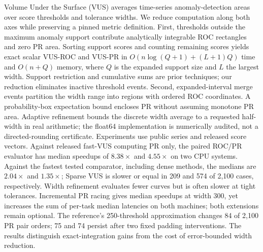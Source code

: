 Volume Under the Surface (VUS) averages time-series anomaly-detection areas
over score thresholds and tolerance widths. We reduce computation along both
axes while preserving a pinned metric definition. First, thresholds outside
the maximum anomaly support contribute analytically integrable ROC rectangles
and zero PR area. Sorting support scores and counting remaining scores yields
exact scalar VUS-ROC and VUS-PR in
$O(n\log(Q+1)+(L+1)Q)$ time and $O(n+Q)$ memory, where $Q$ is the expanded
support size and $L$ the largest width. Support restriction and cumulative
sums are prior techniques; our reduction eliminates inactive threshold events.
Second, expanded-interval merge events partition the width range into regions
with ordered ROC coordinates. A probability-box expectation bound encloses PR
without assuming monotone PR area. Adaptive refinement bounds the discrete
width average to a requested half-width in real arithmetic; the float64
implementation is numerically audited, not a directed-rounding certificate.
Experiments use \NumSeries{} public series and \NumScores{} released score
vectors. Against released fast-VUS computing PR only, the paired ROC/PR
evaluator has median speedups of $8.38\times$ and $4.55\times$ on two CPU systems.
Against the fastest tested comparator, including dense methods, the medians
are $2.04\times$ and $1.35\times$; Sparse VUS is slower or equal in 209 and
574 of 2,100 cases, respectively.
Width refinement evaluates fewer curves but is often slower at tight tolerances.
Incremental PR racing gives median speedups at width 300, yet increases the
sum of per-task median latencies on both machines; both extensions remain optional.
The reference's 250-threshold approximation changes 84 of 2,100 PR pair
orders; 75 and 74 persist after two fixed padding interventions.
The results distinguish exact-integration gains from the cost of
error-bounded width reduction.
